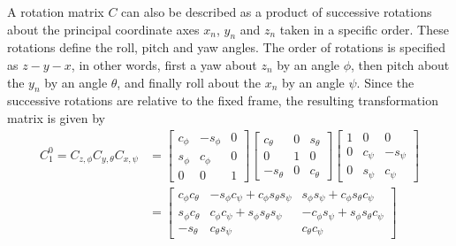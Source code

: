  A rotation matrix $C$ can also be described as a product of successive rotations about the principal coordinate axes $x_n$, $y_n$ and $z_n$ taken in a specific order. These rotations define the roll, pitch and yaw angles. The order of rotations is specified as $z-y-x$, in other words, first a yaw about $z_n$ by an angle $\phi$, then pitch about the $y_n$ by an angle $\theta$, and finally roll about the $x_n$ by an angle $\psi$. Since the successive rotations are relative to the fixed frame, the resulting transformation matrix is given by
 \begin{equation}\label{euler}
 \begin{split}
   C_1^0=C_{z,\phi}C_{y,\theta}C_{x,\psi}&=\left[\begin{array}{ccc}
                                                   c_\phi & -s_\phi & 0 \\
                                                   s_\phi & c_\phi & 0 \\
                                                   0 & 0 & 1
                                                 \end{array}
   \right]\left[\begin{array}{ccc}
                  c_\theta & 0 & s_\theta \\
                  0 & 1 & 0 \\
                  -s_\theta & 0 & c_\theta
                \end{array}\right]\left[\begin{array}{ccc}
                                          1 & 0 & 0 \\
                                          0 & c_\psi & -s_\psi \\
                                          0 & s_\psi & c_\psi
                                        \end{array}\right] \\
                                        &=\left[\begin{array}{ccc}
                                                c_\phi c_\theta & -s_\phi c_\psi+c_\phi s_\theta s_\psi & s_\phi s_\psi+c_\phi s_\theta c_\psi \\
                                                s_\phi c_\theta & c_\phi c_\psi+s_\phi s_\theta s_\psi & -c_\phi s_\psi+s_\phi s_\theta c_\psi \\
                                                -s_\theta & c_\theta s_\psi & c_\theta c_\psi
                                              \end{array}\right]
 \end{split}
 \end{equation}

